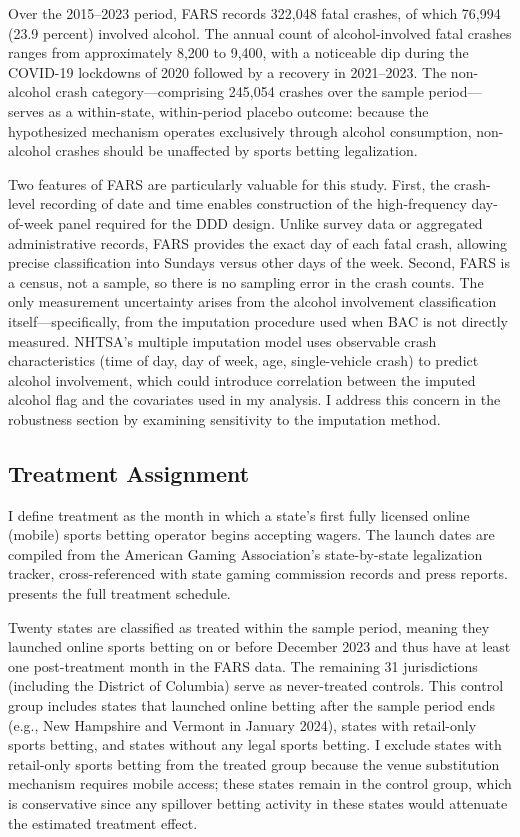 \documentclass[12pt]{article}
\begin{document}
Over the 2015--2023 period, FARS records 322,048 fatal crashes, of which 76,994 (23.9 percent) involved alcohol. The annual count of alcohol-involved fatal crashes ranges from approximately 8,200 to 9,400, with a noticeable dip during the COVID-19 lockdowns of 2020 followed by a recovery in 2021--2023. The non-alcohol crash category---comprising 245,054 crashes over the sample period---serves as a within-state, within-period placebo outcome: because the hypothesized mechanism operates exclusively through alcohol consumption, non-alcohol crashes should be unaffected by sports betting legalization.

Two features of FARS are particularly valuable for this study. First, the crash-level recording of date and time enables construction of the high-frequency day-of-week panel required for the DDD design. Unlike survey data or aggregated administrative records, FARS provides the exact day of each fatal crash, allowing precise classification into Sundays versus other days of the week. Second, FARS is a census, not a sample, so there is no sampling error in the crash counts. The only measurement uncertainty arises from the alcohol involvement classification itself---specifically, from the imputation procedure used when BAC is not directly measured. NHTSA's multiple imputation model uses observable crash characteristics (time of day, day of week, age, single-vehicle crash) to predict alcohol involvement, which could introduce correlation between the imputed alcohol flag and the covariates used in my analysis. I address this concern in the robustness section by examining sensitivity to the imputation method.

\subsection{Treatment Assignment}

I define treatment as the month in which a state's first fully licensed online (mobile) sports betting operator begins accepting wagers. The launch dates are compiled from the American Gaming Association's state-by-state legalization tracker, cross-referenced with state gaming commission records and press reports.  presents the full treatment schedule.

Twenty states are classified as treated within the sample period, meaning they launched online sports betting on or before December 2023 and thus have at least one post-treatment month in the FARS data. The remaining 31 jurisdictions (including the District of Columbia) serve as never-treated controls. This control group includes states that launched online betting after the sample period ends (e.g., New Hampshire and Vermont in January 2024), states with retail-only sports betting, and states without any legal sports betting. I exclude states with retail-only sports betting from the treated group because the venue substitution mechanism requires mobile access; these states remain in the control group, which is conservative since any spillover betting activity in these states would attenuate the estimated treatment effect.
\end{document}
